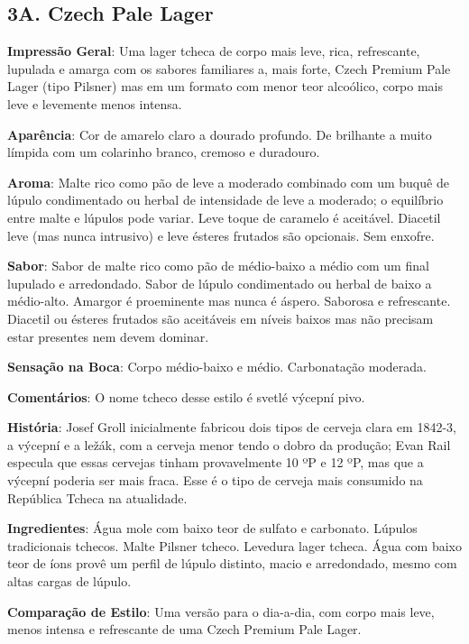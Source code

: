 \subsection*{3A. Czech Pale Lager}
\textbf{Impressão Geral}: Uma lager tcheca de corpo mais leve, rica, refrescante, lupulada e amarga com os sabores familiares a, mais forte, Czech Premium Pale Lager (tipo Pilsner) mas em um formato com menor teor alcoólico, corpo mais leve e levemente menos intensa.

\textbf{Aparência}: Cor de amarelo claro a dourado profundo. De brilhante a muito límpida com um colarinho branco, cremoso e duradouro.

\textbf{Aroma}: Malte rico como pão de leve a moderado combinado com um buquê de lúpulo condimentado ou herbal de intensidade de leve a moderado; o equilíbrio entre malte e lúpulos pode variar. Leve toque de caramelo é aceitável. Diacetil leve (mas nunca intrusivo) e leve ésteres frutados são opcionais. Sem enxofre.

\textbf{Sabor}: Sabor de malte rico como pão de médio-baixo a médio com um final lupulado e arredondado. Sabor de lúpulo condimentado ou herbal de baixo a médio-alto. Amargor é proeminente mas nunca é áspero. Saborosa e refrescante. Diacetil ou ésteres frutados são aceitáveis em níveis baixos mas não precisam estar presentes nem devem dominar.

\textbf{Sensação na Boca}: Corpo médio-baixo e médio. Carbonatação moderada.

\textbf{Comentários}: O nome tcheco desse estilo é svetlé výcepní pivo.

\textbf{História}: Josef Groll inicialmente fabricou dois tipos de cerveja clara em 1842-3, a výcepní e a ležák, com a cerveja menor tendo o dobro da produção; Evan Rail especula que essas cervejas tinham provavelmente 10 ºP e 12 ºP, mas que a výcepní poderia ser mais fraca. Esse é o tipo de cerveja mais consumido na República Tcheca na atualidade.

\textbf{Ingredientes}: Água mole com baixo teor de sulfato e carbonato. Lúpulos tradicionais tchecos. Malte Pilsner tcheco. Levedura lager tcheca. Água com baixo teor de íons provê um perfil de lúpulo distinto, macio e arredondado, mesmo com altas cargas de lúpulo.

\textbf{Comparação de Estilo}: Uma versão para o dia-a-dia, com corpo mais leve, menos intensa e refrescante de uma Czech Premium Pale Lager.

